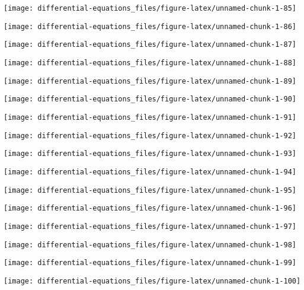 \documentclass[]{tufte-handout}
\begin{document}
\begin{marginfigure}
\texttt{[image: differential-equations\_files/figure-latex/unnamed-chunk-1-85]} \end{marginfigure}
\begin{marginfigure}
\texttt{[image: differential-equations\_files/figure-latex/unnamed-chunk-1-86]} \end{marginfigure}
\begin{marginfigure}
\texttt{[image: differential-equations\_files/figure-latex/unnamed-chunk-1-87]} \end{marginfigure}
\begin{marginfigure}
\texttt{[image: differential-equations\_files/figure-latex/unnamed-chunk-1-88]} \end{marginfigure}
\begin{marginfigure}
\texttt{[image: differential-equations\_files/figure-latex/unnamed-chunk-1-89]} \end{marginfigure}
\begin{marginfigure}
\texttt{[image: differential-equations\_files/figure-latex/unnamed-chunk-1-90]} \end{marginfigure}
\begin{marginfigure}
\texttt{[image: differential-equations\_files/figure-latex/unnamed-chunk-1-91]} \end{marginfigure}
\begin{marginfigure}
\texttt{[image: differential-equations\_files/figure-latex/unnamed-chunk-1-92]} \end{marginfigure}
\begin{marginfigure}
\texttt{[image: differential-equations\_files/figure-latex/unnamed-chunk-1-93]} \end{marginfigure}
\begin{marginfigure}
\texttt{[image: differential-equations\_files/figure-latex/unnamed-chunk-1-94]} \end{marginfigure}
\begin{marginfigure}
\texttt{[image: differential-equations\_files/figure-latex/unnamed-chunk-1-95]} \end{marginfigure}
\begin{marginfigure}
\texttt{[image: differential-equations\_files/figure-latex/unnamed-chunk-1-96]} \end{marginfigure}
\begin{marginfigure}
\texttt{[image: differential-equations\_files/figure-latex/unnamed-chunk-1-97]} \end{marginfigure}
\begin{marginfigure}
\texttt{[image: differential-equations\_files/figure-latex/unnamed-chunk-1-98]} \end{marginfigure}
\begin{marginfigure}
\texttt{[image: differential-equations\_files/figure-latex/unnamed-chunk-1-99]} \end{marginfigure}
\begin{marginfigure}
\texttt{[image: differential-equations\_files/figure-latex/unnamed-chunk-1-100]} \end{marginfigure}
\end{document}
